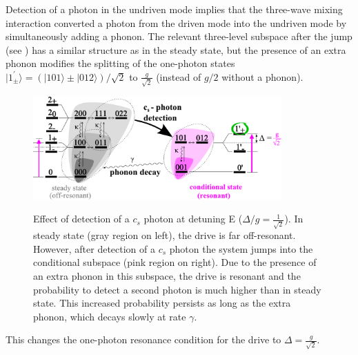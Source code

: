 Detection of a photon in the undriven mode
implies that the three-wave mixing interaction
converted a photon from the driven mode into
the undriven mode by simultaneously adding a phonon.
The relevant three-level subspace after the jump 
(see ) has a similar structure as in the steady state, 
but the presence of an extra phonon
modifies the splitting of the one-photon 
states $|1^\prime_{\pm}\rangle=(|101\rangle \pm |012\rangle)/\sqrt{2}$  to
$\frac{g}{\sqrt{2}}$ 
(instead of $g/2$ without a phonon).
%
\begin{figure}[htb]
\centering  
  \includegraphics[width=0.85\textwidth]{./figs_Komar2013/fig7.pdf}\\
  \caption[Diagram with metastable subspace]
  {
  \label{fig:levels_jumps}
  Effect of detection of a $c_s$ photon
  at detuning E ($\Delta/g = \frac{1}{\sqrt{2}}$).
  In steady state (gray region on left), 
  the drive is far off-resonant.
  However, after detection of a $c_s$ photon the system
  jumps into the conditional subspace (pink region on right).
  Due to the presence of an extra phonon in this subspace,
  the drive is resonant and the probability to detect a second
  photon is much higher than in steady state.
  This increased probability persists
  as long as the extra phonon,
  which decays slowly at rate $\gamma$.
  }
\end{figure}
This changes
the one-photon resonance condition
for the drive to $\Delta = \frac{g}{\sqrt{2}}$.

